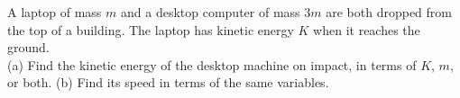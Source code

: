 A laptop of mass $m$ and a desktop computer of mass $3m$ are both
dropped from the top of a building. The laptop has kinetic energy $K$ when it reaches the
ground.\\
%
(a) Find the kinetic energy of the desktop machine
on impact, in terms of $K$, $m$, or both.\answercheck\hwendpart
%
(b) Find its speed in terms of the same variables.\answercheck
